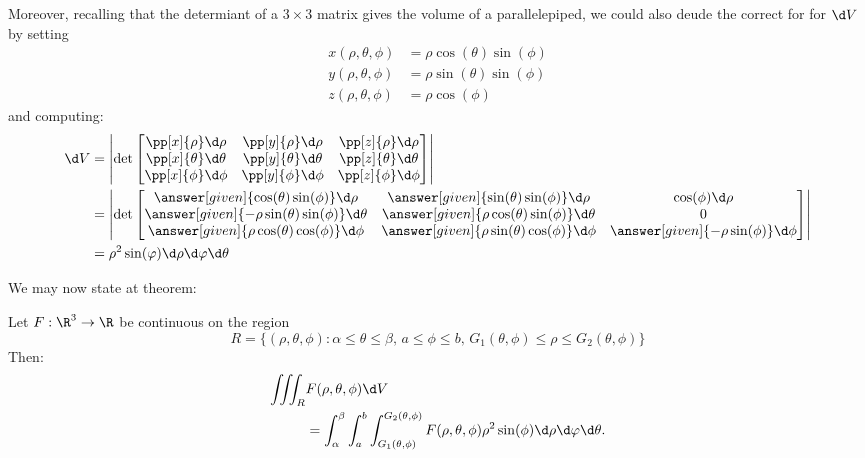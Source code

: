 \documentclass{ximera}
\begin{document}
Moreover, recalling that the determiant of a $3\times 3$ matrix gives
the volume of a parallelepiped, we could also deude the correct for
for $\d V$ by setting
\begin{align*}
  x(\rho,\theta,\phi) &= \rho \cos(\theta)\sin(\phi)\\
  y(\rho,\theta,\phi) &= \rho \sin(\theta)\sin(\phi)\\
  z(\rho,\theta,\phi) &= \rho \cos(\phi)
\end{align*}
and computing:
\begin{align*}
  \d V &= \left| \det
  \begin{bmatrix}
    \pp[x]{\rho} \d \rho & \pp[y]{\rho} \d \rho & \pp[z]{\rho} \d \rho\\
    \pp[x]{\theta} \d \theta & \pp[y]{\theta} \d \theta & \pp[z]{\theta} \d \theta\\
    \pp[x]{\phi} \d \phi & \pp[y]{\phi} \d \phi & \pp[z]{\phi} \d \phi
  \end{bmatrix}
  \right|\\
  &= \left| \det
  \begin{bmatrix}
    \answer[given]{\cos(\theta)\sin(\phi)} \d \rho & \answer[given]{\sin(\theta)\sin(\phi)} \d \rho & \cos(\phi) \d \rho \\
    \answer[given]{-\rho\sin(\theta)\sin(\phi)} \d \theta & \answer[given]{\rho\cos(\theta)\sin(\phi)} \d \theta & 0\\
    \answer[given]{\rho\cos(\theta)\cos(\phi)} \d \phi & \answer[given]{\rho\sin(\theta)\cos(\phi)} \d \phi & \answer[given]{-\rho\sin(\phi)}\d \phi
  \end{bmatrix}
  \right|\\
  &= \rho^2 \sin(\varphi)\d\rho\d\varphi\d\theta
\end{align*}




We may now state at theorem:
\begin{theorem}[Fubini]
  Let $F:\R^3\to\R$ be continuous on the region
  \[
  R=\{(\rho,\theta,\phi):\text{$\alpha\leq\theta\leq\beta$, $a\leq \phi\leq b$, $G_1(\theta,\phi)\le \rho\le G_2(\theta,\phi)$}\}
  \]
  Then: 
  \begin{align*}
  \iiint_R &F(\rho,\theta,\phi)\d V\\
  &= \int_\alpha^\beta\int_{a}^{b} \int_{G_1(\theta,\phi)}^{G_2(\theta,\phi)}F(\rho,\theta,\phi) \rho^2 \sin(\phi)\d\rho\d\varphi\d\theta.
  \end{align*}
\end{theorem}
\end{document}
